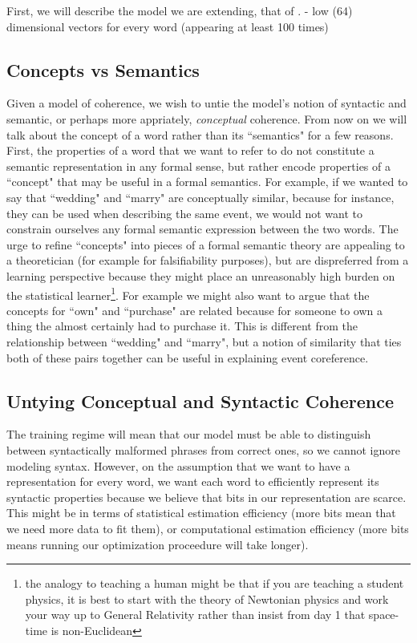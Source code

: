 \documentclass[11pt,letterpaper]{article}
\begin{document}
First, we will describe the model we are extending, that of \cite{rami}.
- low (64) dimensional vectors for every word (appearing at least 100 times)

\subsection{Concepts vs Semantics}
Given a model of coherence, we wish to untie the model's notion of syntactic
and semantic, or perhaps more appriately, {\em conceptual} coherence.
From now on we will talk about the concept of a word rather than its ``semantics"
for a few reasons. First, the properties of a word that we want to refer to do
not constitute a semantic representation in any formal sense, but rather encode
properties of a ``concept" that may be useful in a formal semantics.
For example, if we wanted to say that ``wedding" and ``marry" are conceptually
similar, because for instance, they can be used when describing the same event,
we would not want to constrain ourselves any formal semantic expression between
the two words. The urge to refine ``concepts" into pieces of a formal semantic theory
are appealing to a theoretician (for example for falsifiability purposes), but are
dispreferred from a learning perspective because they might place an unreasonably high
burden on the statistical learner\footnote{the analogy to teaching a human might be that
if you are teaching a student physics, it is best to start with the theory of
Newtonian physics and work your way up to General Relativity rather than insist from
day 1 that space-time is non-Euclidean}.
For example we might also want to argue that the concepts for ``own" and ``purchase"
are related because for someone to own a thing the almost certainly had to purchase it.
This is different from the relationship between ``wedding" and ``marry", but a notion
of similarity that ties both of these pairs together can be useful in explaining
event coreference.

\subsection{Untying Conceptual and Syntactic Coherence}
The training regime will mean that our model must be able to distinguish
between syntactically malformed phrases from correct ones,
so we cannot ignore modeling syntax.
However, on the assumption that we want to have a representation
for every word, we want each word to efficiently represent its
syntactic properties because we believe that bits in our representation are scarce.
This might be in terms of statistical estimation efficiency (more bits mean that we need more data to fit them), 
or computational estimation efficiency (more bits means running our optimization proceedure will take longer).
\end{document}
